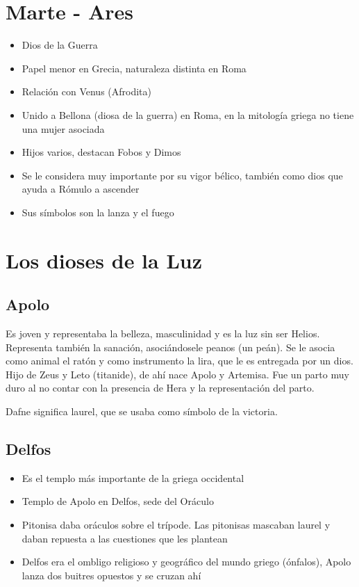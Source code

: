 \section{Marte - Ares}
\begin{itemize}
    \item Dios de la Guerra
    \item Papel menor en Grecia, naturaleza distinta en Roma
    \item Relación con Venus (Afrodita)
    \item Unido a Bellona (diosa de la guerra) en Roma, en la mitología griega no tiene una mujer asociada
    \item Hijos varios, destacan Fobos y Dimos
    \item Se le considera muy importante por su vigor bélico, también como dios que ayuda a Rómulo a ascender
    \item Sus símbolos son la lanza y el fuego
\end{itemize}

\section{Los dioses de la Luz}
\subsection{Apolo}
Es joven y representaba la belleza, masculinidad y es la luz sin ser Helios. Representa también la sanación, asociándosele peanos (un peán). Se le asocia como animal el ratón y como instrumento la lira, que le es entregada por un dios.
Hijo de Zeus y Leto (titanide), de ahí nace Apolo y Artemisa. Fue un parto muy duro al no contar con la presencia de Hera y la representación del parto.

Dafne significa laurel, que se usaba como símbolo de la victoria.

\subsection{Delfos}
\begin{itemize}
    \item Es el templo más importante de la griega occidental
    \item Templo de Apolo en Delfos, sede del Oráculo
    \item Pitonisa daba oráculos sobre el trípode. Las pitonisas mascaban laurel y daban repuesta a las cuestiones que les plantean
    \item Delfos era el ombligo religioso y geográfico del mundo griego (ónfalos), Apolo lanza dos buitres opuestos y se cruzan ahí
\end{itemize}

